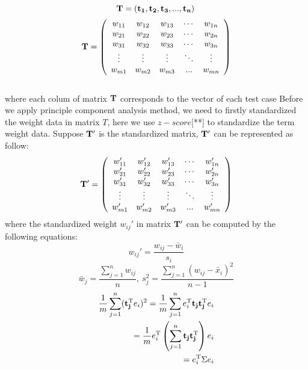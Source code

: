 \documentclass{sig-alternate}
\begin{document}
$$
{\bf T}=\left({\bf t_{1}},{\bf t_{2}},{\bf t_{3}}, ...,{\bf t_{n}} \right)\\
$$
$$
   {\bf T}=\left(
      \begin{array}{cccccc}
        w_{11} & w_{12} & w_{13} & \cdots & w_{1n} \\ 
        w_{21} & w_{22} & w_{23} & \cdots & w_{2n} \\
        w_{31} & w_{32} & w_{33} & \cdots & w_{3n} \\
         \vdots & \vdots & \vdots & \ddots & \vdots\\
       w_{m1} & w_{m2} & w_{m3} & ... & w_{mn}\\
      \end{array}
    \right)
$$\\
where each colum of matrix ${\bf T}$ corresponds to the vector of each test case Before we apply principle component analysis method, we need to firstly standardized the weight data in matrix $T$, here we use $z-score$[**] to standardize the term weight data. Suppose ${\bf T'}$ is the standardized matrix, ${\bf T'}$ can be represented as follow:
$$
{\bf T'}=\left(
      \begin{array}{cccccc}
        w_{11}' & w_{12}' & w_{13}' & \cdots & w_{1n}' \\ 
        w_{21}' & w_{22}' & w_{23}' & \cdots & w_{2n}' \\
        w_{31}' & w_{32}' & w_{33}' & \cdots & w_{3n}' \\
         \vdots & \vdots & \vdots & \ddots & \vdots\\
       w_{m1}' & w_{m2}' & w_{m3}' & ... & w_{mn}'\\
      \end{array}
    \right)
$$
where the standardized weight $w_{ij}'$ in matrix ${\bf T'}$ can be computed by the following equations:
\begin{equation}
w_{ij}' = \frac{w_{ij} - {\bar w_{i}}}{s_{i}}
\end{equation}
\begin{equation}
{\bar w_{j}} = \frac{\sum_{j=1}^{n}w_{ij}}{n},~s_{j}^2 =\frac{ \sum_{j=1}^{n}(w_{ij}-{\bar x_{i}})^2}{n-1}
\end{equation}
\begin{eqnarray}
\frac{1}{m}\sum_{j=1}^{n}({\bf t_{j}^{\mathrm T}}{e_{i}})^2 = \frac{1}{m}\sum_{j=1}^{n}{e_{i}^{\mathrm T}}{\bf t_{j}}{\bf t_{j}^{\mathrm T}}{e_{i}}\\
=\frac{1}{m}{e_{i}^{\mathrm T}}\left({\sum_{j=1}^{n}{\bf t_{j}}{\bf t_{j}^{\mathrm T}}}\right){e_{i}}\\
={e_{i}^{\mathrm T}}\Sigma{e_{i}}
\end{eqnarray}
\end{document}
